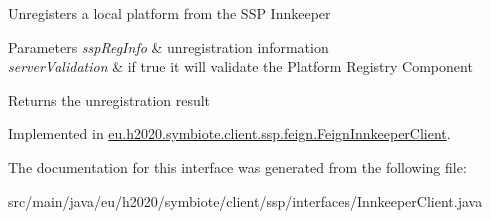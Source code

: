 Unregisters a local platform from the S\+SP Innkeeper


\begin{DoxyParams}{Parameters}
{\em ssp\+Reg\+Info} & unregistration information \\
\hline
{\em server\+Validation} & if true it will validate the Platform Registry Component \\
\hline
\end{DoxyParams}
\begin{DoxyReturn}{Returns}
the unregistration result 
\end{DoxyReturn}


Implemented in \hyperlink{classeu_1_1h2020_1_1symbiote_1_1client_1_1ssp_1_1feign_1_1FeignInnkeeperClient_a33938dd37e6685401225996fc783ea15}{eu.\+h2020.\+symbiote.\+client.\+ssp.\+feign.\+Feign\+Innkeeper\+Client}.



The documentation for this interface was generated from the following file\+:\begin{DoxyCompactItemize}
\item 
src/main/java/eu/h2020/symbiote/client/ssp/interfaces/Innkeeper\+Client.\+java\end{DoxyCompactItemize}
